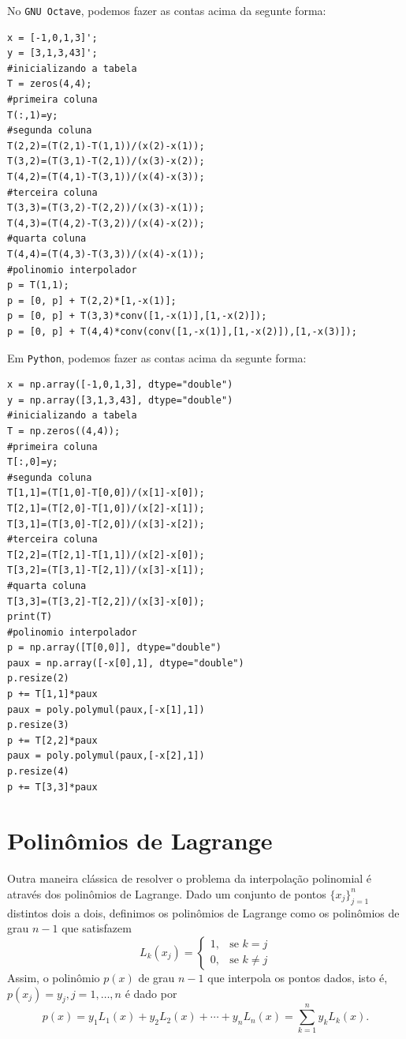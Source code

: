 \begin{sol}
\ifisoctave
No \verb+GNU Octave+, podemos fazer as contas acima da segunte forma:
\begin{verbatim}
x = [-1,0,1,3]';
y = [3,1,3,43]';
#inicializando a tabela
T = zeros(4,4);
#primeira coluna
T(:,1)=y;
#segunda coluna
T(2,2)=(T(2,1)-T(1,1))/(x(2)-x(1));
T(3,2)=(T(3,1)-T(2,1))/(x(3)-x(2));
T(4,2)=(T(4,1)-T(3,1))/(x(4)-x(3));
#terceira coluna
T(3,3)=(T(3,2)-T(2,2))/(x(3)-x(1));
T(4,3)=(T(4,2)-T(3,2))/(x(4)-x(2));
#quarta coluna
T(4,4)=(T(4,3)-T(3,3))/(x(4)-x(1));
#polinomio interpolador
p = T(1,1);
p = [0, p] + T(2,2)*[1,-x(1)];
p = [0, p] + T(3,3)*conv([1,-x(1)],[1,-x(2)]);
p = [0, p] + T(4,4)*conv(conv([1,-x(1)],[1,-x(2)]),[1,-x(3)]);
\end{verbatim}
\fi
\ifispython
Em \verb+Python+, podemos fazer as contas acima da segunte forma:
\begin{verbatim}
x = np.array([-1,0,1,3], dtype="double")
y = np.array([3,1,3,43], dtype="double")
#inicializando a tabela
T = np.zeros((4,4));
#primeira coluna
T[:,0]=y;
#segunda coluna
T[1,1]=(T[1,0]-T[0,0])/(x[1]-x[0]);
T[2,1]=(T[2,0]-T[1,0])/(x[2]-x[1]);
T[3,1]=(T[3,0]-T[2,0])/(x[3]-x[2]);
#terceira coluna
T[2,2]=(T[2,1]-T[1,1])/(x[2]-x[0]);
T[3,2]=(T[3,1]-T[2,1])/(x[3]-x[1]);
#quarta coluna
T[3,3]=(T[3,2]-T[2,2])/(x[3]-x[0]);
print(T)
#polinomio interpolador
p = np.array([T[0,0]], dtype="double")
paux = np.array([-x[0],1], dtype="double")
p.resize(2)
p += T[1,1]*paux
paux = poly.polymul(paux,[-x[1],1])
p.resize(3)
p += T[2,2]*paux
paux = poly.polymul(paux,[-x[2],1])
p.resize(4)
p += T[3,3]*paux
\end{verbatim}
\fi
\end{sol}

\section{Polinômios de Lagrange}
Outra maneira clássica de resolver o problema da interpolação polinomial é através dos polinômios de Lagrange. Dado um conjunto de pontos $\{x_j\}_{j=1}^n$ distintos dois a dois, definimos os polinômios de Lagrange como os polinômios de grau $n-1$ que satisfazem
\begin{equation}
L_k(x_j)=\left\{\begin{array}{rl}
1,& \text{se }k=j\\
0,& \text{se }k\neq j
\end{array}
\right.
\end{equation}
Assim, o polinômio $p(x)$ de grau $n-1$ que interpola os pontos dados, isto é, $p(x_j)=y_j, j=1,\ldots,n$ é dado por
\begin{equation}
  p(x)=y_1L_1(x)+y_2L_2(x)+\cdots +y_nL_n(x)=\sum_{k=1}^n y_k L_k(x).
\end{equation}

